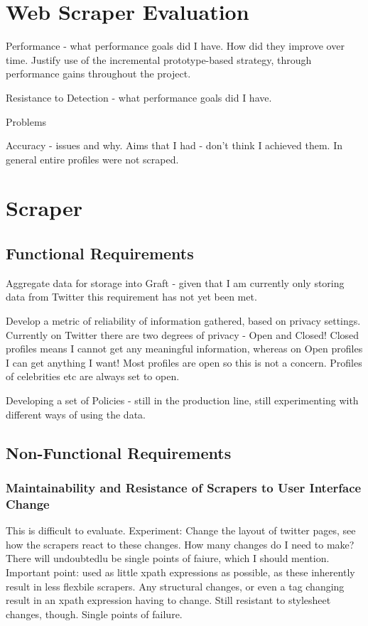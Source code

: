 

\section{Web Scraper Evaluation}

Performance - what performance goals did I have. How did they improve over time. Justify use of the incremental prototype-based strategy, through performance gains throughout the project.

Resistance to Detection - what performance goals did I have.

Problems

Accuracy - issues and why. Aims that I had - don't think I achieved them. In general entire profiles were not scraped. 

\section{Scraper}

\subsection{Functional Requirements}

Aggregate data for storage into Graft - given that I am currently only storing data from Twitter this requirement has not yet been met.

Develop a metric of reliability of information gathered, based on privacy settings. Currently on Twitter there are two degrees of privacy - Open and Closed! Closed profiles means I cannot get any meaningful information, whereas on Open profiles I can get anything I want! Most profiles are open so this is not a concern. Profiles of celebrities etc are always set to open.

Developing a set of Policies - still in the production line, still experimenting with different ways of using the data.

\subsection{Non-Functional Requirements}

\subsubsection{Maintainability and Resistance of Scrapers to User Interface Change}
This is difficult to evaluate. Experiment: Change the layout of twitter pages, see how the scrapers react to these changes. How many changes do I need to make? There will undoubtedlu be single points of faiure, which I should mention. Important point: used as little xpath expressions as possible, as these inherently result in less flexbile scrapers. Any structural changes, or even a tag changing result in an xpath expression having to change. Still resistant to stylesheet changes, though.
Single points of failure.


